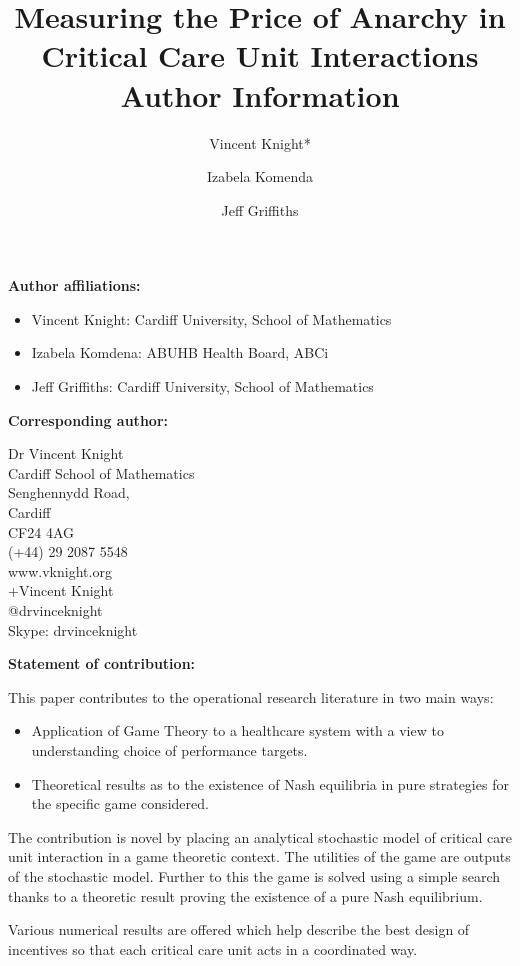 \documentclass{article}
\title{Measuring the Price of Anarchy in Critical Care Unit Interactions\\
Author Information}
\author{Vincent Knight*
    \and
        Izabela Komenda
    \and
        Jeff Griffiths}
\begin{document}
\maketitle

\textbf{Author affiliations:}

\begin{itemize}
    \item Vincent Knight: Cardiff University, School of Mathematics
    \item Izabela Komdena: ABUHB Health Board, ABCi
    \item Jeff Griffiths: Cardiff University, School of Mathematics
\end{itemize}

\textbf{Corresponding author:}

Dr Vincent Knight\\
Cardiff School of Mathematics\\
Senghennydd Road,\\
Cardiff\\
CF24 4AG\\
(+44) 29 2087 5548\\
www.vknight.org\\
+Vincent Knight\\
@drvinceknight\\
Skype: drvinceknight

\textbf{Statement of contribution:}

This paper contributes to the operational research literature in two main ways:

\begin{itemize}
    \item  Application of Game Theory to a healthcare system with a view to
        understanding choice of performance targets.
    \item Theoretical results as to the existence of Nash equilibria in pure
        strategies for the specific game considered.
\end{itemize}

The contribution is novel by placing an analytical stochastic model of critical
care unit interaction in a game theoretic context. The utilities of the game are
outputs of the stochastic model. Further to this the game is solved using a
simple search thanks to a theoretic result proving the existence of a pure Nash
equilibrium.

Various numerical results are offered which help describe the best design of
incentives so that each critical care unit acts in a coordinated way.
\end{document}
